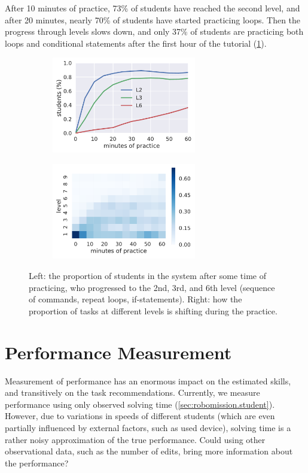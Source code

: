 After 10 minutes of practice, 73\% of students have reached the second level,
and after 20 minutes, nearly 70\% of students have started practicing loops.
Then the progress through levels slows down, and only 37\% of students
are practicing both loops and conditional statements after the first
hour of the tutorial (\cref{fig:students-at-levels}).

\begin{figure}[htb]
\centering
\begin{subfigure}{.49\textwidth}
\centering
\includegraphics[height=42mm]{img/students-at-levels}
\end{subfigure}
\begin{subfigure}{.49\textwidth}
\centering
\includegraphics[height=42mm]{img/task-sessions-at-levels}
\end{subfigure}
\caption{%
  Left: the proportion of students in the system after some time of practicing,
  who progressed to the 2nd, 3rd, and 6th level (sequence of commands, repeat loops, if-statements).
  Right: how the proportion of tasks at different levels is shifting during the practice.}
\label{fig:students-at-levels}
\end{figure}

\section{Performance Measurement}

Measurement of performance has an enormous impact on the estimated skills, %
and transitively on %
the task recommendations. %
Currently, we measure %
performance using only observed solving time
(\cref{sec:robomission.student}).
However, due to variations in speeds of different students
(which are even partially influenced by external factors, such as used device),
solving time is a rather noisy approximation of the true performance.
Could using other observational data, such as the number of edits,
bring more information about the performance?

